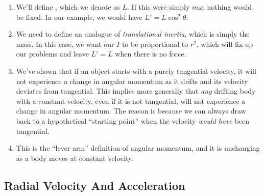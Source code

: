 \begin{enumerate}
  \item We'll define , which we denote as $L$.
  If this were simply $m\omega$, nothing would be fixed. In our example,
  we would have $L' = L \cos^2 \theta$.

  \item We need to define an analogue of \emph{translational inertia},
  which is simply the mass. In this case, we want our  $I$ to be proportional to $r^2$, which will fix-up our
  problems and leave $L' = L$ when there is no force.

  \item We've shown that if an object starts with a purely tangential
  velocity, it will not experience a change in angular momentum as it
  drifts and its velocity deviates from tangential. This implies more
  generally that \emph{any} drifting body with a constant velocity, even
  if it is not tangential, will not experience a change in angular
  momentum. The reason is because we can always draw back to a
  hypothetical ``starting point'' when the velocity \emph{would have}
  been tangential.

  \item This is the ``lever arm'' definition of angular momentum, and it
  is unchanging as a body moves at constant velocity.
\end{enumerate}

\subsection{Radial Velocity And Acceleration}


